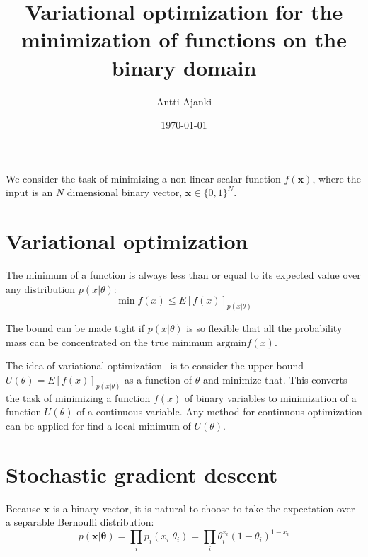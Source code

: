 \documentclass{article}
\title{Variational optimization for the minimization of functions on the binary domain}
\date{\today}
\author{Antti Ajanki}
\renewcommand{\vec}[1]{\boldsymbol{#1}}
\begin{document}
\maketitle

We consider the task of minimizing a non-linear scalar function
$f(\vec{x})$, where the input is an $N$ dimensional binary vector,
$\vec{x} \in \{0, 1\}^N$.

\section{Variational optimization}

The minimum of a function is always less than or equal to its
expected value over any distribution $p(x | \theta)$:
\[
\min f(x) \leq E\left[f(x)\right]_{p(x | \theta)}
\]

The bound can be made tight if $p(x | \theta)$ is so flexible that all
the probability mass can be concentrated on the true minimum
$\text{argmin} f(x)$.

The idea of variational optimization~\cite{staines2012} is to consider
the upper bound $U(\theta) = E\left[f(x)\right]_{p(x | \theta)}$ as a
function of $\theta$ and minimize that. This converts the task of
minimizing a function $f(x)$ of binary variables to minimization of a
function $U(\theta)$ of a continuous variable. Any method for
continuous optimization can be applied for find a local minimum of
$U(\theta)$.

\section{Stochastic gradient descent}

Because $\vec{x}$ is a binary vector, it is natural to choose to take
the expectation over a separable Bernoulli distribution:
\[
p(\vec{x} | \vec{\theta}) = \prod_i p_i(x_i | \theta_i) = \prod_i
\theta_i^{x_i} (1 - \theta_i)^{1-x_i}
\]
\end{document}
